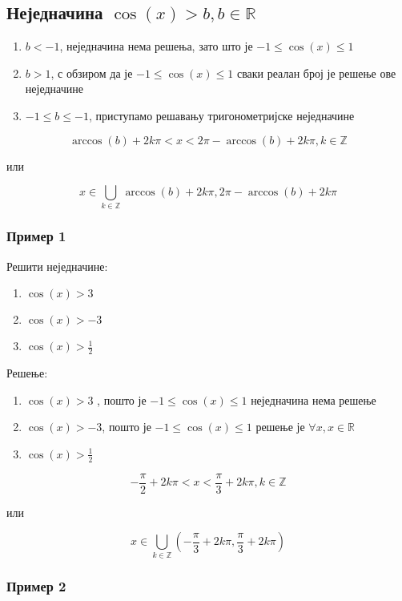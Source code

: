 \documentclass[../diplomski.tex]{subfiles}
\begin{document}
\subsection{Неједначина $\cos(x)>b, b\in\mathbb{R}$}

\begin{enumerate}[label=\alph*)]
\item $b<-1$, неједначина нема решења, зато што је $-1\leq\cos(x)\leq1$
\item $b>1$, с обзиром да је $-1\leq\cos(x)\leq1$ сваки реалан број је решење ове неједначине
\item $-1\leq b\leq-1$, приступамо решавању тригонометријске неједначине
\end{enumerate}



\[\arccos(b)+2k\pi<x<2\pi-\arccos(b)+2k\pi,k\in\mathbb{Z}\]
\centerline{или}
\[x\in\bigcup_{k\in\mathbb{Z}}\arccos(b)+2k\pi,2\pi-\arccos(b)+2k\pi\]

\subsubsection{Пример 1}

Решити неједначине:

\begin{enumerate}[label=\alph*)]
\item $\cos(x)>3$
\item $\cos(x)>-3$
\item $\cos(x)>\frac{1}{2}$
\end{enumerate}

Решење:

\begin{enumerate}[label=\alph*)]
\item $\cos(x)>3$ , пошто је $-1\leqslant\cos(x)\leqslant1$ неједначина нема решење
\item $\cos(x)>-3$, пошто је $-1\leqslant\cos(x)\leqslant1$ решење је $\forall x,x\in\mathbb{R}$
\item $\cos(x)>\frac{1}{2}$
\end{enumerate}



\[-\frac{\pi}{2}+2k\pi<x<\frac{\pi}{3}+2k\pi,k\in\mathbb{Z}\]
\centerline{или}
\[x\in\bigcup_{k\in\mathbb{Z}}\left(-\frac{\pi}{3}+2k\pi,\frac{\pi}{3}+2k\pi\right)\]


\subsubsection{Пример 2}
\end{document}
